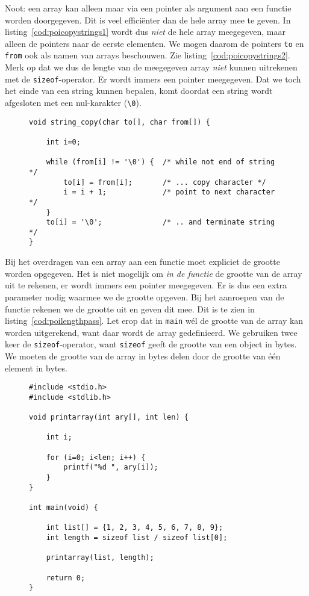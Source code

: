Noot: een array kan alleen maar via een pointer als argument aan een functie worden doorgegeven. Dit is veel efficiënter dan de hele array mee te geven. In listing~\ref{cod:poicopystrings1} wordt dus \textsl{niet} de hele array meegegeven, maar alleen de pointers naar de eerste elementen. We mogen daarom de pointers \texttt{to} en \texttt{from} ook als namen van arrays beschouwen.  Zie listing~\ref{cod:poicopystrings2}. Merk op dat we dus de lengte van de meegegeven array \textsl{niet} kunnen uitrekenen met de \texttt{sizeof}-operator. Er wordt immers een pointer meegegeven. Dat we toch het einde van een string kunnen bepalen, komt doordat een string wordt afgesloten met een nul-karakter (\lstinline|\0|). %

\begin{figure}[!ht]
\begin{lstlisting}[caption=Functie voor het kopieren van een string met behulp van arrays.,label=cod:poicopystrings2]
void string_copy(char to[], char from[]) {

    int i=0;

    while (from[i] != '\0') {  /* while not end of string */
        to[i] = from[i];       /* ... copy character */
        i = i + 1;             /* point to next character */
    }
    to[i] = '\0';              /* .. and terminate string */
}
\end{lstlisting}
\end{figure}

Bij het overdragen van een array aan een functie moet expliciet de grootte worden opgegeven. Het is niet mogelijk om \textsl{in de functie} de grootte van de array uit te rekenen, er wordt immers een pointer meegegeven. Er is dus een extra parameter nodig waarmee we de grootte opgeven. Bij het aanroepen van de functie rekenen we de grootte uit en geven dit mee. Dit is te zien in listing~\ref{cod:poilengthpass}. Let erop dat in \texttt{main} w\'el de grootte van de array kan worden uitgerekend, want daar wordt de array gedefinieerd. We gebruiken twee keer de \texttt{sizeof}-operator, want \texttt{sizeof} geeft de grootte van een object in bytes. We moeten de grootte van de array in bytes delen door de grootte van \'e\'en element in bytes.

\begin{figure}[!ht]
\begin{lstlisting}[caption=Meegeven van de grootte van een array.,label=cod:poilengthpass]
#include <stdio.h>
#include <stdlib.h>

void printarray(int ary[], int len) {

    int i;

    for (i=0; i<len; i++) {
        printf("%d ", ary[i]);
    }
}

int main(void) {

    int list[] = {1, 2, 3, 4, 5, 6, 7, 8, 9};
    int length = sizeof list / sizeof list[0];

    printarray(list, length);

    return 0;
}
\end{lstlisting}
\end{figure}


